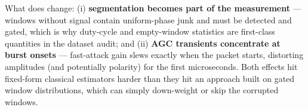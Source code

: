 What does change: (i) \textbf{segmentation becomes part of the measurement}
--- windows without signal contain uniform-phase junk and must be detected
and gated, which is why duty-cycle and empty-window statistics are
first-class quantities in the dataset audit; and (ii) \textbf{AGC transients
concentrate at burst onsets} --- fast-attack gain slews exactly when the
packet starts, distorting amplitudes (and potentially polarity) for the first
microseconds. Both effects hit fixed-form classical estimators harder than
they hit an approach built on gated window distributions, which can simply
down-weight or skip the corrupted windows.
